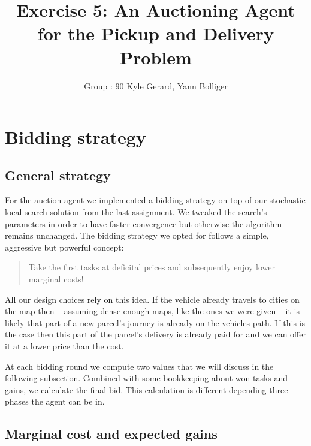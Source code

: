 \documentclass[11pt]{article}
\title{\bf Exercise 5: An Auctioning Agent for the Pickup and Delivery Problem}
\author{Group \textnumero : 90  Kyle Gerard, Yann Bolliger}
\begin{document}
  \maketitle

  \section{Bidding strategy}


  \subsection{General strategy}

  For the auction agent we implemented a bidding strategy on top of our stochastic
  local search solution from the last assignment. We tweaked the search's
  parameters in order to have faster convergence but otherwise the algorithm
  remains unchanged. The bidding strategy we opted for follows a simple,
  aggressive but powerful concept:

  \begin{quotation}
    Take the first tasks at deficital prices and subsequently enjoy lower marginal
    costs!
  \end{quotation}

  All our design choices rely on this idea. If the vehicle already travels to
  cities on the map then -- assuming dense enough maps, like the ones we were
  given -- it is likely that part of a new parcel's journey is already on the
  vehicles path. If this is the case then this part of the parcel's delivery is
  already paid for and we can offer it at a lower price than the cost.

  At each bidding round we compute two values that we will discuss in the
  following subsection. Combined with some bookkeeping about won tasks and gains,
  we calculate the final bid. This calculation is different depending three phases
  the agent can be in.


  \subsection{Marginal cost and expected gains}
\end{document}
